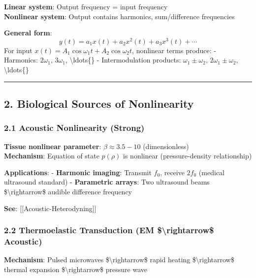 \textbf{Linear system}: Output frequency = input frequency\\
\textbf{Nonlinear system}: Output contains harmonics, sum/difference
frequencies

\textbf{General form}:
\[y(t) = a_1 x(t) + a_2 x^2(t) + a_3 x^3(t) + \cdots\] For input
\(x(t) = A_1 \cos\omega_1 t + A_2 \cos\omega_2 t\), nonlinear terms
produce: - Harmonics: \(2\omega_1\), \(3\omega_1\),
\textbackslash ldots\{\} - Intermodulation products:
\(\omega_1 \pm \omega_2\), \(2\omega_1 \pm \omega_2\),
\textbackslash ldots\{\}

\begin{center}\rule{0.5\linewidth}{0.5pt}\end{center}

\subsection{2. Biological Sources of
Nonlinearity}\label{biological-sources-of-nonlinearity}

\subsubsection{\texorpdfstring{2.1 Acoustic Nonlinearity
(Strong)}{2.1 Acoustic Nonlinearity  (Strong)}}\label{acoustic-nonlinearity-strong}

\textbf{Tissue nonlinear parameter}: \(\beta \approx 3.5-10\)
(dimensionless)\\
\textbf{Mechanism}: Equation of state \(p(\rho)\) is nonlinear
(pressure-density relationship)

\textbf{Applications}: - \textbf{Harmonic imaging}: Transmit \(f_0\),
receive \(2f_0\) (medical ultrasound standard) - \textbf{Parametric
arrays}: Two ultrasound beams \$\textbackslash rightarrow\$ audible
difference frequency

\textbf{See}: {[}{[}Acoustic-Heterodyning{]}{]}

\subsubsection{\texorpdfstring{2.2 Thermoelastic Transduction (EM
\$\textbackslash rightarrow\$
Acoustic)}{2.2 Thermoelastic Transduction  (EM \$\textbackslash rightarrow\$ Acoustic)}}\label{thermoelastic-transduction-em-acoustic}

\textbf{Mechanism}: Pulsed microwaves \$\textbackslash rightarrow\$
rapid heating \$\textbackslash rightarrow\$ thermal expansion
\$\textbackslash rightarrow\$ pressure wave

